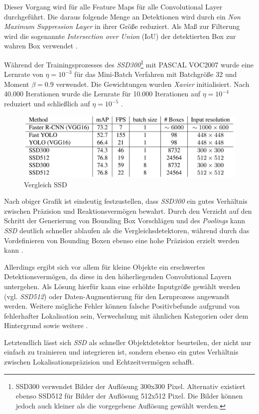 Dieser Vorgang wird für alle Feature Maps für alle Convolutional Layer durchgeführt. Die daraus folgende Menge an Detektionen wird durch ein \textit{Non Maximum Suppression Layer} in ihrer Größe reduziert. Als Maß zur Filterung wird die sogenannte \textit{Intersection over Union} (IoU) der detektierten Box zur wahren Box verwendet \cite{ssd.20161229}.

Während der Trainingsprozesses des \textit{SSD300}\footnote{SSD300 verwendet Bilder der Auflösung 300x300 Pixel. Alternativ existiert ebenso SSD512 für Bilder der Auflösung 512x512 Pixel. Die Bilder können jedoch auch kleiner als die vorgegebene Auflösung gewählt werden.} mit PASCAL VOC2007 wurde eine Lernrate von $\eta = 10^{-3}$ für das Mini-Batch Verfahren mit Batchgröße 32 und Moment $\beta = 0.9$ verwendet. Die Gewichtungen wurden \textit{Xavier} initialisiert. Nach 40.000 Iterationen wurde die Lernrate für 10.000 Iterationen auf $\eta = 10^{-4}$ reduziert und schließlich auf $\eta = 10^{-5}$ \cite{ssd.20161229}. 

\begin{figure}[ht]
	\begin{center}
		\includegraphics[width=16cm]{Bilder/ssd_results.png} 
		\caption[Vergleich SSD]{Vergleich SSD \cite{ssd.20161229}}
		\label{result}
	\end{center}
\end{figure}

Nach obiger Grafik ist eindeutig festzustellen, dass \textit{SSD300} ein gutes Verhältnis zwischen Präzision und Reaktionsvermögen bewahrt. Durch den Verzicht auf den Schritt der Generierung von Bounding Box Vorschlägen und des \textit{Poolings} kann \textit{SSD} deutlich schneller ablaufen als die Vergleichsdetektoren, während durch das Vordefinieren von Bounding Boxen ebenso eine hohe Präzision erzielt werden kann \cite{ssd.20161229}.

Allerdings ergibt sich vor allem für kleine Objekte ein erschwertes Detektionsvermögen, da diese in den höherliegenden Convolutional Layern untergehen. Als Lösung hierfür kann eine erhöhte Inputgröße gewählt werden (vgl. \textit{SSD512}) oder Daten-Augmentierung für den Lernprozess angewandt werden. Weitere mögliche Fehler können falsche Positivbefunde aufgrund von fehlerhafter Lokalisation sein, Verwechslung mit ähnlichen Kategorien oder dem Hintergrund sowie weitere \cite{ssd.20161229}.

Letztendlich lässt sich \textit{SSD} als schneller Objektdetektor beurteilen, der nicht nur einfach zu trainieren und integrieren ist, sondern ebenso ein gutes Verhältnis zwischen Lokalisationspräzision und Echtzeitvermögen schafft.
